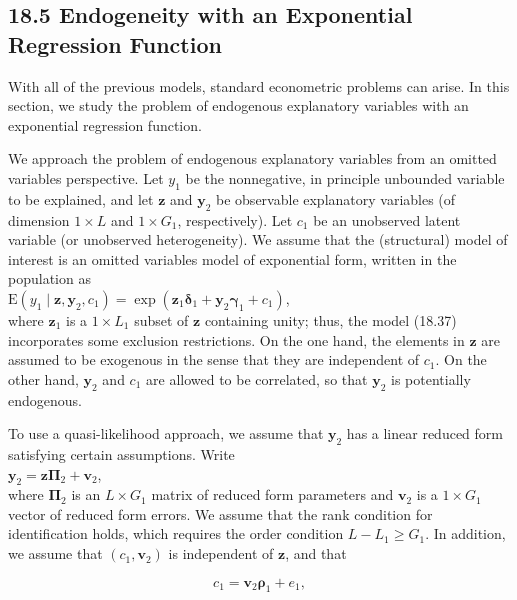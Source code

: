\documentclass[10pt]{article}
\begin{document}
\subsection*{18.5 Endogeneity with an Exponential Regression Function}
With all of the previous models, standard econometric problems can arise. In this section, we study the problem of endogenous explanatory variables with an exponential regression function.

We approach the problem of endogenous explanatory variables from an omitted variables perspective. Let $y_{1}$ be the nonnegative, in principle unbounded variable to be explained, and let $\mathbf{z}$ and $\mathbf{y}_{2}$ be observable explanatory variables (of dimension $1 \times L$ and $1 \times G_{1}$, respectively). Let $c_{1}$ be an unobserved latent variable (or unobserved heterogeneity). We assume that the (structural) model of interest is an omitted variables model of exponential form, written in the population as\\
$\mathrm{E}\left(y_{1} \mid \mathbf{z}, \mathbf{y}_{2}, c_{1}\right)=\exp \left(\mathbf{z}_{1} \boldsymbol{\delta}_{1}+\mathbf{y}_{2} \boldsymbol{\gamma}_{1}+c_{1}\right)$,\\
where $\mathbf{z}_{1}$ is a $1 \times L_{1}$ subset of $\mathbf{z}$ containing unity; thus, the model (18.37) incorporates some exclusion restrictions. On the one hand, the elements in $\mathbf{z}$ are assumed to be exogenous in the sense that they are independent of $c_{1}$. On the other hand, $\mathbf{y}_{2}$ and $c_{1}$ are allowed to be correlated, so that $\mathbf{y}_{2}$ is potentially endogenous.

To use a quasi-likelihood approach, we assume that $\mathbf{y}_{2}$ has a linear reduced form satisfying certain assumptions. Write\\
$\mathbf{y}_{2}=\mathbf{z} \boldsymbol{\Pi}_{2}+\mathbf{v}_{2}$,\\
where $\boldsymbol{\Pi}_{2}$ is an $L \times G_{1}$ matrix of reduced form parameters and $\mathbf{v}_{2}$ is a $1 \times G_{1}$ vector of reduced form errors. We assume that the rank condition for identification holds, which requires the order condition $L-L_{1} \geq G_{1}$. In addition, we assume that $\left(c_{1}, \mathbf{v}_{2}\right)$ is independent of $\mathbf{z}$, and that


\begin{equation*}
c_{1}=\mathbf{v}_{2} \boldsymbol{\rho}_{1}+e_{1}, \tag{18.39}
\end{equation*}
\end{document}
